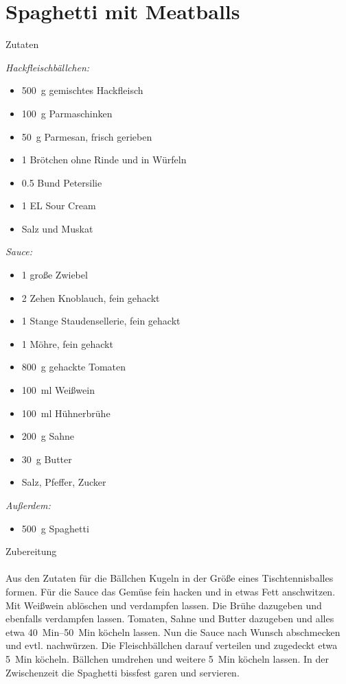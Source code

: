 \section*{Spaghetti mit Meatballs}
\ihead{}\ohead{}
\cfoot{}
{\Large Zutaten}
\begin{multicols}{2}
\textit{Hackfleischbällchen:}
\begin{itemize}
    \item \SI{500}{g} gemischtes Hackfleisch
    \item \SI{100}{g} Parmaschinken
    \item \SI{50}{g} Parmesan, frisch gerieben
    \item \num{1} Brötchen ohne Rinde und in Würfeln
    \item \num{0.5} Bund Petersilie
    \item \num{1} EL Sour Cream
    \item Salz und Muskat
\end{itemize}
\textit{Sauce:}
\begin{itemize}
    \item \num{1} große Zwiebel
    \item \num{2} Zehen Knoblauch, fein gehackt
    \item \num{1} Stange Staudensellerie, fein gehackt
    \item \num{1} Möhre, fein gehackt
    \item \SI{800}{g} gehackte Tomaten
    \item \SI{100}{ml} Weißwein
    \item \SI{100}{ml} Hühnerbrühe
    \item \SI{200}{g} Sahne
    \item \SI{30}{g} Butter
    \item Salz, Pfeffer, Zucker
\end{itemize}
\textit{Außerdem:}
\begin{itemize}
    \item \SI{500}{g} Spaghetti
\end{itemize}
\end{multicols}
\noindent
{\Large Zubereitung}\\
\\
Aus den Zutaten für die Bällchen Kugeln in der Größe eines Tischtennisballes formen.
Für die Sauce das Gemüse fein hacken und in etwas Fett anschwitzen. 
Mit Weißwein ablöschen und verdampfen lassen.
Die Brühe dazugeben und ebenfalls verdampfen lassen. 
Tomaten, Sahne und Butter dazugeben und alles etwa \SIrange{40}{50}{Min} köcheln lassen. 
Nun die Sauce nach Wunsch abschmecken und evtl. nachwürzen. 
Die Fleischbällchen darauf verteilen und zugedeckt etwa \SI{5}{Min} köcheln. 
Bällchen umdrehen und weitere \SI{5}{Min} köcheln lassen. 
In der Zwischenzeit die Spaghetti bissfest garen und servieren. 
